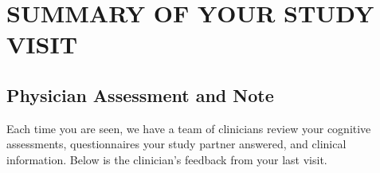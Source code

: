 \section{SUMMARY OF YOUR STUDY VISIT}

\subsection{Physician Assessment and Note}

Each time you are seen, we have a team of clinicians review your cognitive
assessments, questionnaires your study partner answered, and clinical
information. Below is the clinician’s feedback from your last visit.